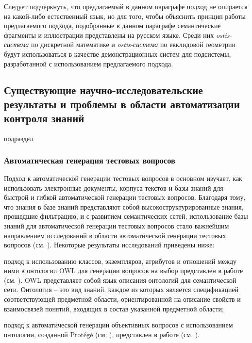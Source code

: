 Следует подчеркнуть, что предлагаемый в данном параграфе подход не опирается на какой-либо естественный язык, но для того, чтобы объяснить принцип работы предлагаемого подхода, подобранные в данном параграфе семантические фрагменты и иллюстрации представлены на русском языке. Среди них \textit{ostis-система} по дискретной математике и \textit{ostis-система} по евклидовой геометрии будут использоваться в качестве демонстрационных систем для подсистемы, разработанной с использованием предлагаемого подхода.

\subsection{Существующие научно-исследовательские результаты и проблемы в области автоматизации контроля знаний}
\label{subsec_research_results_problems_field_knowledge_control_automation}

\begin{SCn}
	\begin{scnrelfromlist}{подраздел}
	\end{scnrelfromlist}
\end{SCn}

\subsubsection{Автоматическая генерация тестовых вопросов}
\label{subsubsec_automatic_generation_test_questions}

Подход к автоматической генерации тестовых вопросов в основном изучает, как использовать электронные документы, корпуса текстов и базы знаний для быстрой и гибкой автоматической генерации тестовых вопросов. Благодаря тому, что знания в базе знаний представляют собой высокоструктурированные знания, прошедшие фильтрацию, и с развитием семантических сетей, использование базы знаний для автоматической генерации тестовых вопросов стало важнейшим направлением исследований в области автоматической генерации тестовых вопросов (см. ). Некоторые результаты исследований приведены ниже:

\begin{textitemize}
	\item подход к использованию классов, экземпляров, атрибутов и отношений между ними в онтологии OWL для генерации вопросов на выбор представлен в работе (см. ). OWL представляет собой язык описания онтологий для семантической сети. Онтология – это вид знаний, каждое из которых является спецификацией соответствующей предметной области, ориентированной на описание свойств и взаимосвязей понятий, входящих в состав указанной предметной области; 
	\item подход к автоматической генерации объективных вопросов с использованием онтологии, созданной Protégé (см. ), представлен в работе (см. ).
\end{textitemize}

